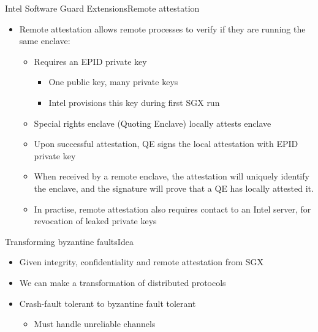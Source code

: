 \documentclass{beamer}
\begin{document}
\begin{frame}{Intel Software Guard Extensions}{Remote attestation}
    \begin{itemize}
    	\item Remote attestation allows remote processes to verify if they are running the same enclave:
    	\begin{itemize}

  			\vfill

    		\item Requires an EPID private key
    		\begin{itemize}
    			\item One public key, many private keys
    			\item Intel provisions this key during first SGX run 
    		\end{itemize}

  			\vfill

    		\item Special rights enclave (Quoting Enclave) locally attests enclave

  			\vfill

    		\item Upon successful attestation, QE signs the local attestation with EPID private key

  			\vfill

    		\item When received by a remote enclave, the attestation will uniquely identify the enclave, and the signature will prove that a QE has locally attested it.

  			\vfill

  			\item In practise, remote attestation also requires contact to an Intel server, for revocation of leaked private keys 
    	\end{itemize}
    \end{itemize}
\end{frame}

\begin{frame}{Transforming byzantine faults}{Idea} %
  \begin{itemize}
  	\item Given integrity, confidentiality and remote attestation from SGX

  	\vfill

  	\item We can make a transformation of distributed protocols

  	\vfill

  	\item Crash-fault tolerant to byzantine fault tolerant
  	\begin{itemize}
  		\item Must handle unreliable channels
  	\end{itemize}
  \end{itemize}
\end{frame}
\end{document}
